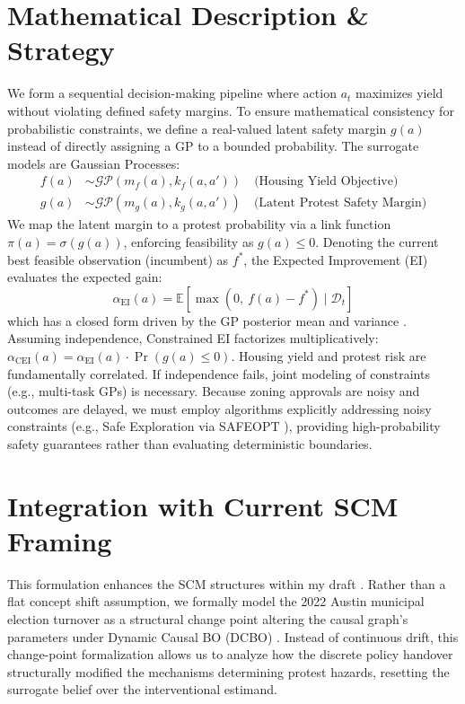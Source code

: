 \documentclass[11pt,twoside]{article}
\begin{document}
\section*{Mathematical Description \& Strategy}
We form a sequential decision-making pipeline where action $a_t$ maximizes yield without violating defined safety margins. To ensure mathematical consistency for probabilistic constraints, we define a real-valued latent safety margin $g(a)$ instead of directly assigning a GP to a bounded probability. The surrogate models are Gaussian Processes:
\begin{align*}
    f(a) &\sim \mathcal{GP}(m_f(a), k_f(a, a')) \quad \text{(Housing Yield Objective)} \\
    g(a) &\sim \mathcal{GP}(m_g(a), k_g(a, a')) \quad \text{(Latent Protest Safety Margin)}
\end{align*}
We map the latent margin to a protest probability via a link function $\pi(a)=\sigma(g(a))$, enforcing feasibility as $g(a) \le 0$. Denoting the current best feasible observation (incumbent) as $f^*$, the Expected Improvement (EI) evaluates the expected gain:
\[
    \alpha_{\text{EI}}(a) = \mathbb{E}[\max(0, \ f(a) - f^*) \mid \mathcal{D}_t]
\]
which has a closed form driven by the GP posterior mean and variance \citep{garnett2023bayesian}. Assuming independence, Constrained EI factorizes multiplicatively: $\alpha_{\text{CEI}}(a) = \alpha_{\text{EI}}(a) \cdot \Pr(g(a) \le 0)$. Housing yield and protest risk are fundamentally correlated. If independence fails, joint modeling of constraints (e.g., multi-task GPs) is necessary. Because zoning approvals are noisy and outcomes are delayed, we must employ algorithms explicitly addressing noisy constraints (e.g., Safe Exploration via SAFEOPT \citep{sui2015safeopt}), providing high-probability safety guarantees rather than evaluating deterministic boundaries.

\section*{Integration with Current SCM Framing}
This formulation enhances the SCM structures within my draft \citep{peters2016icp, arjovsky2019irm, krueger2021rex, shi2022sc}. Rather than a flat concept shift assumption, we formally model the 2022 Austin municipal election turnover as a structural change point altering the causal graph's parameters under Dynamic Causal BO (DCBO) \citep{aglietti2021dcbo}. Instead of continuous drift, this change-point formalization allows us to analyze how the discrete policy handover structurally modified the mechanisms determining protest hazards, resetting the surrogate belief over the interventional estimand.
\end{document}

